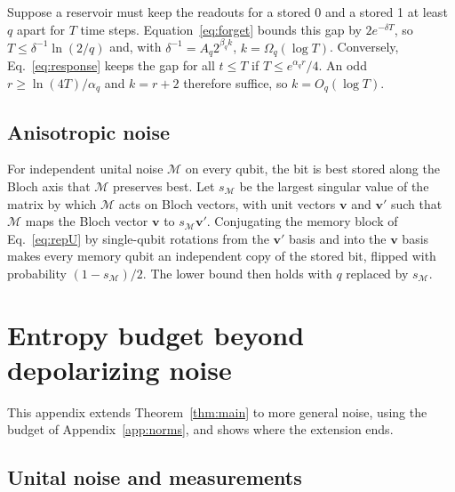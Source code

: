 \documentclass[aps,pra,reprint,superscriptaddress,floatfix]{revtex4-2}
\theoremstyle{plain}
\begin{document}
Suppose a reservoir must keep the readouts for a stored 0 and a stored 1 at least $q$ apart for $T$ time steps. Equation~\eqref{eq:forget} bounds this gap by $2e^{-\delta T}$, so $T\le\delta^{-1}\ln(2/q)$ and, with $\delta^{-1}=A_q2^{\beta_qk}$, $k=\Omega_q(\log T)$. Conversely, Eq.~\eqref{eq:response} keeps the gap for all $t\le T$ if $T\le e^{\alpha_qr}/4$. An odd $r\ge\ln(4T)/\alpha_q$ and $k=r+2$ therefore suffice, so $k=O_q(\log T)$.

\subsection{Anisotropic noise}

For independent unital noise $\mathcal M$ on every qubit, the bit is best stored along the Bloch axis that $\mathcal M$ preserves best. Let $s_{\mathcal M}$ be the largest singular value of the matrix by which $\mathcal M$ acts on Bloch vectors, with unit vectors $\bm v$ and $\bm v'$ such that $\mathcal M$ maps the Bloch vector $\bm v$ to $s_{\mathcal M}\bm v'$. Conjugating the memory block of Eq.~\eqref{eq:repU} by single-qubit rotations from the $\bm v'$ basis and into the $\bm v$ basis makes every memory qubit an independent copy of the stored bit, flipped with probability $(1-s_{\mathcal M})/2$. The lower bound then holds with $q$ replaced by $s_{\mathcal M}$.

\section{Entropy budget beyond depolarizing noise}
\label{app:noise}

This appendix extends Theorem~\ref{thm:main} to more general noise, using the budget of Appendix~\ref{app:norms}, and shows where the extension ends.

\subsection{Unital noise and measurements}
\end{document}
